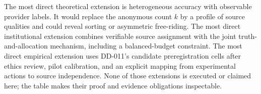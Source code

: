 \documentclass[11pt]{article}
\begin{document}
The most direct theoretical extension is heterogeneous accuracy with observable
provider labels. It would replace the anonymous count $k$ by a profile of source
qualities and could reveal sorting or asymmetric free-riding. The most direct
institutional extension combines verifiable source assignment with the joint
truth-and-allocation mechanism, including a balanced-budget constraint. The
most direct empirical extension uses DD-011's candidate preregistration cells after
ethics review, pilot calibration, and an explicit mapping from experimental
actions to source independence. None of those extensions is executed or claimed
here; the table makes their proof and evidence obligations inspectable.

\begingroup
\footnotesize


\endgroup
\end{document}
